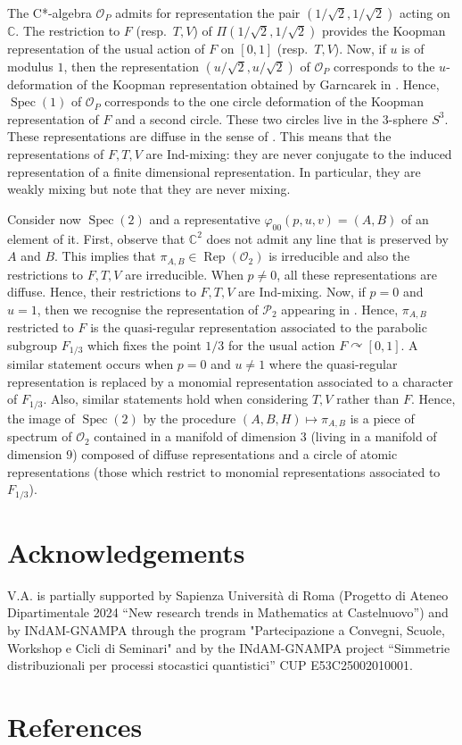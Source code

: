 \documentclass[12pt, a4paper]{amsart}
\def\Spec{\operatorname{Spec}}
\def\C{\mathbb{C}}
\newcommand{\CO}[0]{\mathcal{O}} \newcommand{\CP}[0]{\mathcal{P}}
\DeclareMathOperator{\Rep}{Rep}
\numberwithin{equation}{section}
\begin{document}
The C*-algebra $\CO_P$ admits for representation the pair $(1/\sqrt 2,1/\sqrt 2)$ acting on $\C$. 
The restriction to $F$ (resp.~$T,V$) of $\Pi(1/\sqrt 2,1/\sqrt 2)$ provides the Koopman representation of the usual action of $F$ on $[0,1]$ (resp.~$T,V$).
Now, if $u$ is of modulus $1$, then the representation $(u/\sqrt 2,u/\sqrt 2)$ of $\CO_P$ corresponds to the $u$-deformation of the Koopman representation obtained by Garncarek in \cite{Garncarek12}.
Hence, $\Spec(1)$ of $\CO_P$ corresponds to the one circle deformation of the Koopman representation of $F$ and a second circle. 
These two circles live in the 3-sphere $S^3.$
These representations are diffuse in the sense of \cite{Brothier-Wijesena25}.
This means that the representations of $F,T,V$ are Ind-mixing: they are never conjugate to the induced representation of a finite dimensional representation. 
In particular, they are weakly mixing but note that they are never mixing.

Consider now $\Spec(2)$ and a representative $\varphi_{00}(p,u,v)=(A,B)$ of an element of it.
First, observe that $\C^2$ does not admit any line that is preserved by $A$ and $B$.
This implies that $\pi_{A,B}\in\Rep(\CO_2)$ is irreducible and also the restrictions to $F,T,V$ are irreducible.
When $p\neq 0$, all these representations are diffuse. Hence, their restrictions to $F,T,V$ are Ind-mixing.
Now, if $p=0$ and $u=1$, then we recognise the representation of $\CP_2$ appearing in \cite[Section 6.1]{Brothier-Jones19}.
Hence, $\pi_{A,B}$ restricted to $F$ is the quasi-regular representation associated to the parabolic subgroup $F_{1/3}$ which fixes the point $1/3$ for the usual action $F\curvearrowright [0,1]$. 
A similar statement occurs when $p=0$ and $u\neq 1$ where the quasi-regular representation is replaced by a monomial representation associated to a character of $F_{1/3}$. 
Also, similar statements hold when considering $T,V$ rather than $F.$
Hence, the image of $\Spec(2)$ by the procedure $(A,B,H)\mapsto \pi_{A,B}$ is a piece of spectrum of $\CO_2$ contained in a manifold of dimension 3 (living in a manifold of dimension $9$) composed of diffuse representations and a circle of atomic representations (those which restrict to monomial representations associated to $F_{1/3}$).

\section*{Acknowledgements} 
 V.A. is partially supported by Sapienza Universit\`a di Roma (Progetto di Ateneo Dipartimentale 2024 “New research trends in Mathematics at Castelnuovo”)
 and  by  INdAM-GNAMPA  
through the program "Partecipazione a Convegni, Scuole, Workshop e
Cicli di Seminari" and by the INdAM-GNAMPA  project
“Simmetrie distribuzionali per processi stocastici quantistici” CUP E53C25002010001.
 

 

\section*{References}
\begin{biblist}
\end{biblist}

 
\end{document}
